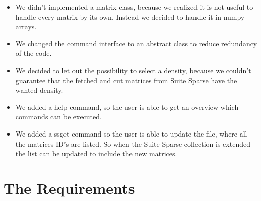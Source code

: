 \documentclass[parskip=full]{scrartcl}
\begin{document}
\begin{itemize}

\item We didn't implemented a matrix class, because we realized it is not useful to handle every matrix by its own. 
Instead we decided to handle it in numpy arrays.

\item We changed the command interface to an abstract class to reduce redundancy of the code.

\item We decided to let out the possibility to select a density, because we couldn't guarantee that the fetched and cut matrices from Suite Sparse have the wanted density.

\item We added a help command, so the user is able to get an overview which commands can be executed.

\item We added a \gls{ssget} command so the user is able to update the file, where all the matrices ID's are listed.
So when the Suite Sparse collection is extended the list can be updated to include the new matrices. 

\end{itemize}


\section{The Requirements}
\end{document}
